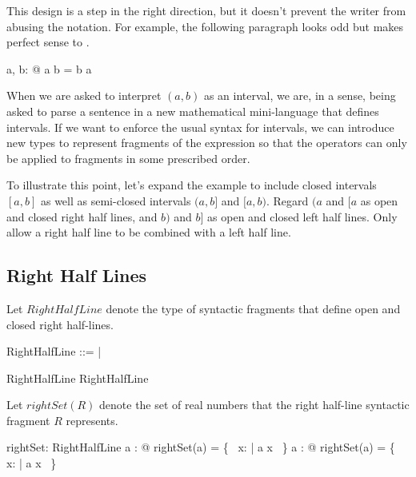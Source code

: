 \documentclass{amsart}
\begin{document}
This design is a step in the right direction, but it doesn't prevent the writer from abusing the notation.
For example, the following paragraph looks odd but makes perfect sense to \fuzz.

\begin{zed}
	\forall a, b: \R @ \lowerBound a \intersect b \upperBound = b \upperBound \intersect \lowerBound a 
\end{zed}

When we are asked to interpret $(a,b)$ as an interval, we are, in a sense, being asked to parse a sentence
in a new mathematical mini-language that defines intervals.
If we want to enforce the usual syntax for intervals,
we can introduce new types to represent fragments of the expression so that the operators can only be applied to
fragments in some prescribed order.

To illustrate this point, let's expand the example to include closed intervals $[a,b]$ as well as semi-closed intervals
$(a,b]$ and $[a,b)$.
Regard $(a$ and $[a$ as open and closed right half lines, and $b)$ and $b]$ as open and closed left half lines.
Only allow a right half line to be combined with a left half line.

\subsection{Right Half Lines}

Let \hypertarget{RightHalfLine}{$RightHalfLine$} denote the type of syntactic fragments that define open and closed right half-lines.

\begin{zed}
	RightHalfLine ::= \openLowerBound \ldata \R \rdata | \closedLowerBound \ldata \R \rdata
\end{zed}

\begin{example}

\begin{zed}
	\openLowerBound \zeroR \in RightHalfLine
\also
	\closedLowerBound \oneR \in RightHalfLine
\end{zed}

\end{example}

Let $rightSet(R)$ denote the set of real numbers that the right half-line syntactic fragment $R$ represents.

\begin{axdef}
	rightSet: RightHalfLine \fun \power \R
\where
	\forall a : \R @ rightSet(\openLowerBound a) = \{~ x: \R | a \ltR x ~\}
\also
	\forall a : \R @ rightSet(\closedLowerBound a) = \{~ x: \R | a \leR x ~\}
\end{axdef}
\end{document}
